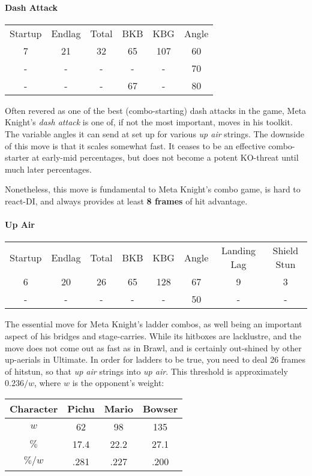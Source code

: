\paragraph{Dash Attack}
\begin{center}
	\begin{tabular}{| c  c  c | c  c  c |}
		\hline
		Startup	& Endlag & Total & BKB & KBG & Angle \\
		7	&	21	&	32	&	65	&	107 & 	60\deg \\
		-	&	-	&	-	&	- 	& 	- 	&	70\deg	\\
		-	&	-	&	-	&	67	&	-	&	80\deg	\\
		\hline
	\end{tabular}
\end{center}
Often revered as one of the best (combo-starting) dash attacks in the game, Meta Knight's \emph{dash attack} is one of, if not the most important, moves in his toolkit. The variable angles it can send at set up for various \textit{up air} strings. The downside of this move is that it scales somewhat fast. It ceases to be an effective combo-starter at early-mid percentages, but does not become a potent KO-threat until much later percentages.

Nonetheless, this move is fundamental to Meta Knight's combo game, is hard to react-DI, and always provides at least \textbf{8 frames} of hit advantage.

\paragraph{Up Air}
\begin{center}
	\begin{tabular}{| c  c  c | c  c  c | c  c |}
		\hline
		Startup	& Endlag & Total & BKB & KBG & Angle &	Landing Lag	&	Shield Stun	\\
		6	&	20	&	26	&	65	&	128 & 	67\deg	&	9 	&	3	\\
		-	&	-	&	-	&	- 	& 	- 	&	50\deg	&	-	&	-	\\
		\hline
	\end{tabular}
\end{center}
The essential move for Meta Knight's ladder combos, as well  being an important aspect of his bridges and stage-carries. While its hitboxes are lacklustre, and the move does not come out as fast as in Brawl, and is certainly out-shined by other up-aerials in Ultimate. In order for ladders to be true, you need to deal 26 frames of hitstun, so that \textit{up air} strings into \emph{up air}. This threshold is approximately $0.236/w$, where $w$ is the opponent's weight:
\begin{center}
\begin{tabular}{| c c c c |}
	\hline
	\textbf{Character} & Pichu & Mario & Bowser	\\
	\hline
	$w$		&	62		&	98		&	135		\\
	$\%$	&	17.4	&	22.2	&	27.1	\\
	$\%/w$	&	.281	&	.227	&	.200	\\
	\hline
\end{tabular}
\end{center}

